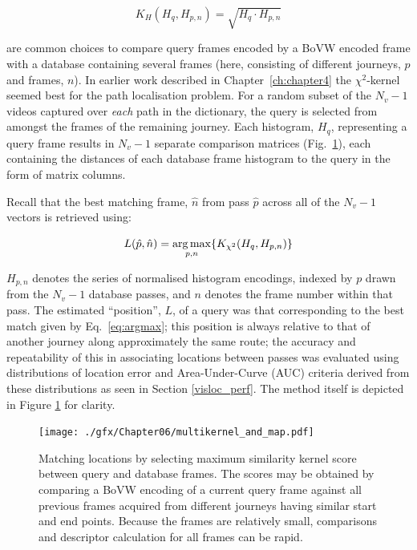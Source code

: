 \begin{equation}
K_{H}(H_q, H_{p,n}) =  \sqrt{H_q \cdot H_{p,n}}
\label{eq:hellingerkernel}
\end{equation}

are common choices to compare query frames encoded by a BoVW encoded frame with a database containing several frames (here, consisting of different journeys, $p$ and frames, $n$). In earlier work described in Chapter~\ref{ch:chapter4} the $\chi^2$-kernel seemed best for the path localisation problem.   For a random subset of the $N_v-1$ videos captured over \textit{each} path in the dictionary, the query is selected from amongst the frames of the remaining journey. Each histogram, $H_q$, representing a query frame results in $N_v-1$ separate comparison matrices (Fig.~\ref{fig:matching_from_kernels}), each containing the distances of each database frame histogram to the query in the form of matrix columns. 


Recall that the best matching frame, $\hat{n}$ from pass $\hat{p}$ across all of the $N_v-1$ vectors is retrieved using: 

\begin{equation}
\centering
L(\hat{p},\hat{n}) = \underset{p,n}{\arg \max} \lbrace K_{\chi^2}(H_q,H_{p,n})\rbrace
\label{eq:argmax2}
\end{equation}


$H_{p,n}$ denotes the series of normalised histogram encodings, indexed by $p$ drawn from the $N_v-1$ database passes, and $n$ denotes the frame number within that pass.  The estimated ``position'', $L$, of a query was that corresponding to the best match given by Eq.~\ref{eq:argmax}; this position is always relative to that of another journey along approximately the same route; the accuracy and repeatability of this in associating locations between passes was evaluated using distributions of location error and Area-Under-Curve (AUC) criteria derived from these distributions as seen in Section \ref{visloc_perf}. The method itself is depicted in Figure \ref{fig:matching_from_kernels} for clarity.

\begin{figure}
\centering
\texttt{[image: ./gfx/Chapter06/multikernel\_and\_map.pdf]}
\caption{Matching locations by selecting maximum similarity kernel score between query and database frames.  The scores may be obtained by comparing a BoVW encoding of a current query frame against all previous frames acquired from different journeys having similar start and end points. Because the frames are relatively small, comparisons and descriptor calculation for all frames can be rapid.}
\label{fig:matching_from_kernels}
\end{figure}


